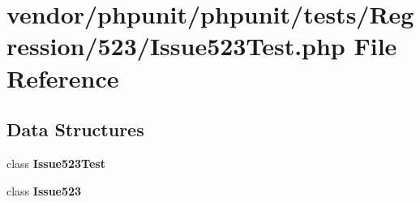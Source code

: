 \section{vendor/phpunit/phpunit/tests/\+Regression/523/\+Issue523\+Test.php File Reference}
\label{_issue523_test_8php}
\subsection*{Data Structures}
\begin{DoxyCompactItemize}
\item 
class {\bf Issue523\+Test}
\item 
class {\bf Issue523}
\end{DoxyCompactItemize}
